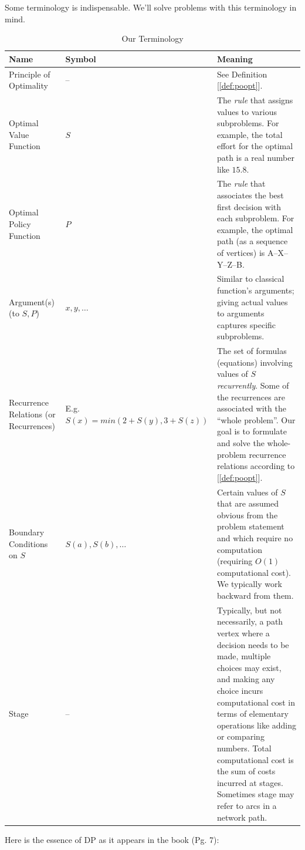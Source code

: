 \documentclass[english,notitlepage,smartquotes]{hgbreport}
\theoremstyle{definition}
\theoremstyle{definition}
\theoremstyle{remark}
\theoremstyle{definition}
\theoremstyle{plain}
\theoremstyle{definition}
\begin{document}
Some terminology is indispensable. We'll solve problems with this terminology in mind.
\begin{table}[h!]
\centering
\begin{tabular}{l|l|l}
Name&Symbol&Meaning\\
\hline
Principle of Optimality & -- & \multicolumn{1}{p{6cm}}{See Definition [\ref{def:poopt}].}\\
Optimal Value Function & $S$ & \multicolumn{1}{p{6cm}}{The \emph{rule} that assigns values to various subproblems. For example, the total effort for the optimal path is a real number like $15.8$.}\\
Optimal Policy Function & $P$ & \multicolumn{1}{p{6cm}}{The \emph{rule} that associates the best first decision with each subproblem. For example, the optimal path (as a sequence of vertices) is A--X--Y--Z--B.}\\
Argument(s) (to $S,P$) & $x,y,\dots$ & \multicolumn{1}{p{6cm}}{Similar to classical function's arguments; giving actual values to arguments captures specific subproblems.}\\
\multicolumn{1}{p{4cm}|}{\raggedright Recurrence Relations (or Recurrences)}& \multicolumn{1}{|p{3cm}|}{\raggedright E.g. $S(x)=min(2+S(y),3+S(z))$} & \multicolumn{1}{p{6cm}}{The set of formulas (equations) involving values of $S$ \textit{recurrently}. Some of the recurrences are associated with the ``whole problem''. Our goal is to formulate and solve the whole-problem recurrence relations according to [\ref{def:poopt}].}\\
Boundary Conditions on $S$ & $S(a),S(b),\dots$ & \multicolumn{1}{p{6cm}}{Certain values of $S$ that are assumed obvious from the problem statement and which require no computation (requiring $O(1)$ computational cost). We typically work backward from them.}\\
Stage&--&\multicolumn{1}{p{6cm}}{Typically, but not necessarily, a path vertex where a decision needs to be made, multiple choices may exist, and making any choice incurs computational cost in terms of elementary operations like adding or comparing numbers. Total computational cost is the sum of costs incurred at stages. Sometimes stage may refer to arcs in a network path.}\\
\hline
\end{tabular}
\caption{Our Terminology}
\label{tab:dpterms}
\end{table}

Here is the essence of DP as it appears in the book (Pg. 7):
\end{document}
